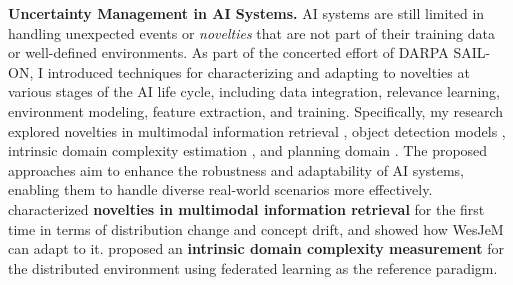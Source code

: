 \textbf{Uncertainty Management in AI Systems. }
%
%
%
AI systems are still limited in handling unexpected events or \textit{novelties} that are not part of their training data or well-defined environments. As part of the concerted effort of DARPA SAIL-ON, I introduced  techniques for characterizing and adapting to novelties at various stages of the AI life cycle, 
including data integration, relevance learning, environment modeling, feature extraction, and training. Specifically, my research explored novelties in multimodal information retrieval \cite{solaiman2022open}, object detection models \cite{nesen2021dataset}, intrinsic domain complexity estimation \cite{solaiman2023domainComplexity}, and planning domain \cite{solaiman2022measurement}. The proposed approaches aim to enhance the robustness and adaptability of AI systems, enabling them to handle diverse real-world scenarios more effectively. \cite{solaiman2022open} characterized \textbf{novelties in multimodal information retrieval} for the first time in terms of distribution change and concept drift, and showed how WesJeM can adapt to it. \cite{solaiman2023domainComplexity} proposed an \textbf{intrinsic domain complexity measurement} for the distributed environment using federated learning as the reference paradigm.

